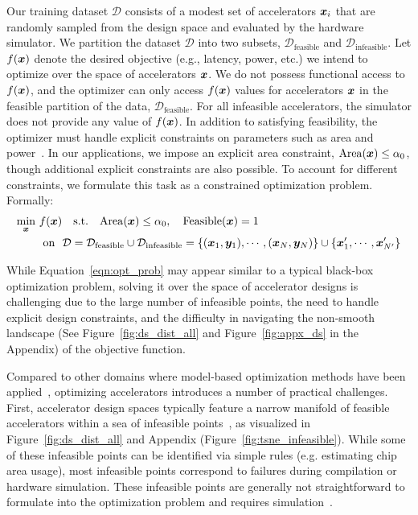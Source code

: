 Our training dataset $\mathcal{D}$ consists of a modest set of accelerators ${\boldsymbol{x}}_i$ that are randomly sampled from the design space and evaluated by the hardware simulator. We partition the dataset $\mathcal{D}$ into two subsets, $\mathcal{D}_\text{feasible}$ and $\mathcal{D}_\text{infeasible}$. Let $f({\boldsymbol{x}})$ denote the desired objective (e.g., latency, power, etc.) we intend to optimize over the space of accelerators ${\boldsymbol{x}}$. We do not possess functional access to $f({\boldsymbol{x}})$, and the optimizer can only access $f({\boldsymbol{x}})$ values for accelerators ${\boldsymbol{x}}$ in the feasible partition of the data, $\mathcal{D}_\text{feasible}$.
%
For all infeasible accelerators, the simulator does not provide any value of $f({\boldsymbol{x}})$.
In addition to satisfying feasibility, the optimizer must handle explicit constraints on parameters such as area and power~\citep{flynn2011computer}. In our applications, we impose an explicit area constraint, $\mathrm{Area}({\boldsymbol{x}}) \leq \alpha_0$, though additional explicit constraints are also possible. 
%
To account for different constraints, we formulate this task as a constrained optimization problem.
%
Formally:  
\begin{equation}
\label{eqn:opt_prob}
\vspace{-0.2cm}
\begin{aligned}
\min_{\rvx}~ & f(\rvx)
~~~\textrm{s.t.}~~~\mathrm{Area}(\rvx) \leq \review{\alpha_0}, ~~~ \mathrm{Feasible}(\rvx) = 1 \\
\quad &~\text{on}~~ \mathcal{D} = \mathcal{D}_\text{feasible} \cup \mathcal{D}_\text{infeasible} = \{(\rvx_1, \rvy_1), \cdots, (\rvx_N, \rvy_N)\} \cup \{\rvx'_1, \cdots, \rvx'_{N'}\}
\end{aligned}
\end{equation}
%


While Equation~\ref{eqn:opt_prob} may appear similar to a typical black-box optimization problem, solving it over the space of accelerator designs is challenging due to the large number of infeasible points, the need to handle explicit design constraints, and the difficulty in navigating the non-smooth landscape (See Figure~\ref{fig:ds_dist_all} and Figure~\ref{fig:appx_ds} in the Appendix) of the objective function.
%


 Compared to other domains where model-based optimization methods have been applied~\citep{brookes19a,trabucco2021conservative}, optimizing accelerators introduces a number of practical challenges.
%
First, accelerator design spaces typically feature a narrow manifold of feasible accelerators within a sea of infeasible points~\citep{prac_dse:mascots:2019,shi2020learned,gelbart2014bayesian}, as visualized in Figure~\ref{fig:ds_dist_all} and Appendix (Figure~\ref{fig:tsne_infeasible}).
%
While some of these infeasible points can be identified via simple rules (e.g. estimating chip area usage), most infeasible points correspond to failures during compilation or hardware simulation. These infeasible points are generally not straightforward to formulate into the optimization problem and requires simulation~\citep{shi2020learned,timeloop,yazdanbakhsh2021apollo}.

